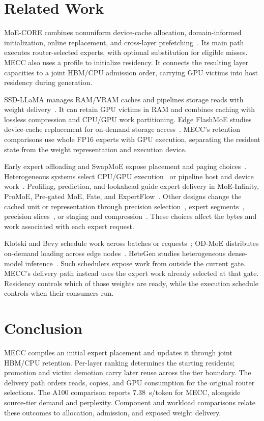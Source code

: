 \documentclass[conference,9pt,letterpaper]{IEEEtran}
\begin{document}
\balance
\section{Related Work}
MoE-CORE combines nonuniform device-cache allocation, domain-informed initialization, online replacement, and cross-layer prefetching~\cite{core}. Its main path executes router-selected experts, with optional substitution for eligible misses. MECC also uses a profile to initialize residency. It connects the resulting layer capacities to a joint HBM/CPU admission order, carrying GPU victims into host residency during generation.

SSD-LLaMA manages RAM/VRAM caches and pipelines storage reads with weight delivery~\cite{ssdllama}. It can retain GPU victims in RAM and combines caching with lossless compression and CPU/GPU work partitioning. Edge FlashMoE studies device-cache replacement for on-demand storage access~\cite{flashmoe}. MECC's retention comparisons use whole FP16 experts with GPU execution, separating the resident state from the weight representation and execution device.

Early expert offloading and SwapMoE expose placement and paging choices~\cite{offloading,swapmoe}. Heterogeneous systems select CPU/GPU execution~\cite{fiddler,daop} or pipeline host and device work~\cite{lightning}. Profiling, prediction, and lookahead guide expert delivery in MoE-Infinity, ProMoE, Pre-gated MoE, Fate, and ExpertFlow~\cite{moeinfinity,promoe,pregated,fate,expertflow}. Other designs change the cached unit or representation through precision selection~\cite{hobbit,specter}, expert segments~\cite{moepic}, precision slices~\cite{slicemoe}, or staging and compression~\cite{mira,zipmoe}. These choices affect the bytes and work associated with each expert request.

Klotski and Bevy schedule work across batches or requests~\cite{klotski,bevy}; OD-MoE distributes on-demand loading across edge nodes~\cite{odmoe}. HeteGen studies heterogeneous dense-model inference~\cite{hetegen}. Such schedulers expose work from outside the current gate. MECC's delivery path instead uses the expert work already selected at that gate. Residency controls which of those weights are ready, while the execution schedule controls when their consumers run.

\section{Conclusion}
MECC compiles an initial expert placement and updates it through joint HBM/CPU retention. Per-layer ranking determines the starting residents; promotion and victim demotion carry later reuse across the tier boundary. The delivery path orders reads, copies, and GPU consumption for the original router selections. The A100 comparison reports 7.38~s/token for MECC, alongside source-tier demand and perplexity. Component and workload comparisons relate these outcomes to allocation, admission, and exposed weight delivery.
\end{document}
